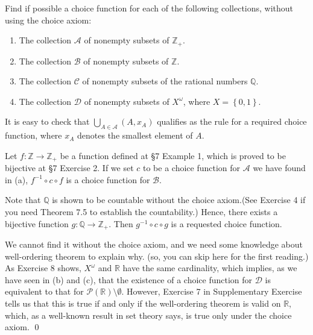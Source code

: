 \documentclass[a4paper,12pt]{article}
\begin{document}
\begin{exe}
	Find if possible a choice function for each of the following collections,
	without using the choice axiom:
	\begin{enumerate}
		\item
		      The collection \( \mathcal{A} \) of nonempty subsets of \( \mathbb{Z}_{+} \).
		      
		\item
		      The collection \( \mathcal{B} \) of nonempty subsets of \( \mathbb{Z}\).
		      
		\item
		      The collection \( \mathcal{C} \) of nonempty subsets of the rational numbers \( \mathbb{Q}\).
		      
		\item
		      The collection \( \mathcal{D} \) of nonempty subsets of \( X^{\omega} \),
		      where \( X=\left\{ 0,1 \right\} \).
	\end{enumerate}
\end{exe}
\begin{sol}\leavevmode \par
	It is easy to check that 
	\( \bigcup_{A\in\mathcal{A}}(A,x_A) \)
	qualifies as the rule for a required choice function,
	where \( x_A \) denotes the smallest element of \( A \).
	
	Let \( f:\mathbb{Z} \to \mathbb{Z}_{+} \) be a function defined at \S7 Example 1,
	which is proved to be bijective at \S7 Exercise 2.
	If we set \( c \) to be a choice function for \( \mathcal{A} \) we have found in (a),
	\( f ^{-1} \circ c \circ f \) is a choice function for \( \mathcal{B} \).
	
	Note that \( \mathbb{Q} \) is shown to be countable without the choice axiom.(See Exercise 4 if you need Theorem 7.5 to establish the countability.)
	Hence, there exists a bijective function \( g:\mathbb{Q} \to \mathbb{Z}_{+} \).
	Then 
	\( g ^{-1} \circ c \circ g \) is a requested choice function.
	
	We cannot find it without the choice axiom,
	and we need some knowledge about well-ordering theorem to explain why.
	(so, you can skip here for the first reading.)
	As Exercise 8 shows, \( X^{\omega} \) and \( \mathbb{R} \) have the same cardinality,
	which implies, as we have seen in (b) and (c),
	that the existence of a choice function for \( \mathcal{D} \) is
	equivalent to that for \( \mathcal{P}(\mathbb{R})\setminus \emptyset \).
	However, Exercise 7 in Supplementary Exercise tells us that
	this is true if and only if the well-ordering theorem is valid on \( \mathbb{R} \),
	which, as a well-known result in set theory says,
	is true only under the choice axiom.
	\qed\end{sol}
\end{document}
